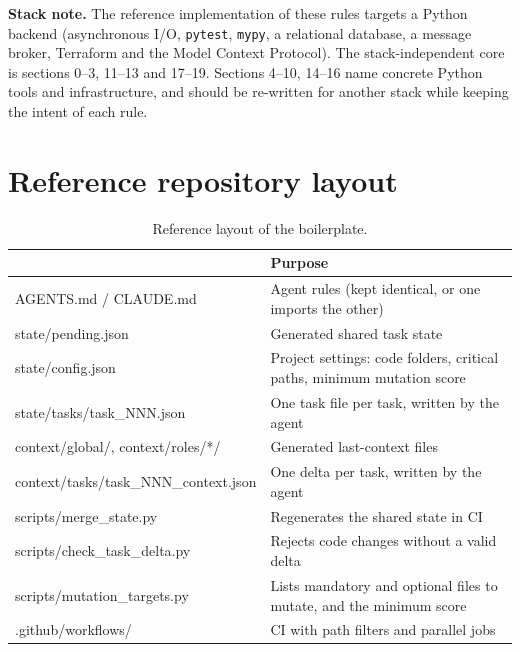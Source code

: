 \documentclass[11pt,a4paper]{article}
\begin{document}
\medskip
\noindent\textbf{Stack note.} The reference implementation of these rules targets a Python backend (asynchronous I/O, \texttt{pytest}, \texttt{mypy}, a relational database, a message broker, Terraform and the Model Context Protocol). The stack-independent core is sections 0--3, 11--13 and 17--19. Sections 4--10, 14--16 name concrete Python tools and infrastructure, and should be re-written for another stack while keeping the intent of each rule.

\bigskip
\begingroup
\small
\setlength{\parskip}{3pt}

\endgroup

\section{Reference repository layout}
\label{app:layout}

\begin{table}[H]
\centering
\small
\begin{tabularx}{\textwidth}{@{}>{\footnotesize\ttfamily\raggedright\arraybackslash}p{6.9cm}>{\raggedright\arraybackslash}X@{}}
\toprule
\multicolumn{1}{@{}l}{\textbf{Path}} & \textbf{Purpose}\\
\midrule
AGENTS.md / CLAUDE.md & Agent rules (kept identical, or one imports the other)\\
state/pending.json & Generated shared task state\\
state/config.json & Project settings: code folders, critical paths, minimum mutation score\\
state/tasks/task\_NNN.json & One task file per task, written by the agent\\
context/global/, context/roles/*/ & Generated last-context files\\
context/tasks/task\_NNN\_context.json & One delta per task, written by the agent\\
scripts/merge\_state.py & Regenerates the shared state in CI\\
scripts/check\_task\_delta.py & Rejects code changes without a valid delta\\
scripts/mutation\_targets.py & Lists mandatory and optional files to mutate, and the minimum score\\
.github/workflows/ & CI with path filters and parallel jobs\\
\bottomrule
\end{tabularx}
\caption{Reference layout of the boilerplate.}
\label{tab:layout}
\end{table}
\end{document}
